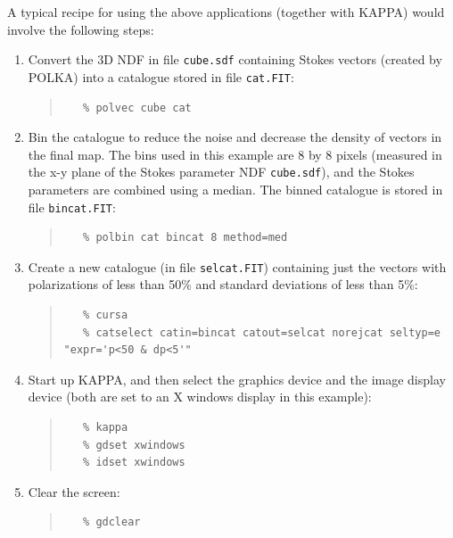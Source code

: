 \documentclass[twoside,11pt]{article}
\renewcommand{\_}{\texttt{\symbol{95}}}
\newenvironment{myquote}{\begin{quote}\begin{small}}{\end{small}\end{quote}}
\begin{document}
A typical recipe for using the above applications (together with KAPPA)
would involve the following steps:

\begin{enumerate}

\item Convert the 3D NDF in file \verb+cube.sdf+ containing Stokes vectors
(created by POLKA) into a catalogue stored in file \verb+cat.FIT+:

\begin{myquote}
\begin{verbatim}
   % polvec cube cat
\end{verbatim}
\end{myquote}

\item Bin the catalogue to reduce the noise and decrease the density
of vectors in the final map. The bins used in this example are 8 by 
8 pixels (measured in
the x-y plane of the Stokes parameter NDF \verb+cube.sdf+), and the
Stokes parameters are combined using a median. The binned catalogue is
stored in file \verb+bincat.FIT+:

\begin{myquote}
\begin{verbatim}
   % polbin cat bincat 8 method=med
\end{verbatim}
\end{myquote}

\item Create a new catalogue (in file \verb+selcat.FIT+) containing just
the vectors with polarizations of less than 50\% and standard deviations of
less than 5\%:

\begin{myquote}
\begin{verbatim}
   % cursa
   % catselect catin=bincat catout=selcat norejcat seltyp=e "expr='p<50 & dp<5'"
\end{verbatim}
\end{myquote}

\item \label{STEP:DEVICE} Start up KAPPA, and then select the graphics 
device and the image display device (both are set to an X windows display 
in this example):
\begin{myquote}
\begin{verbatim}
   % kappa
   % gdset xwindows
   % idset xwindows
\end{verbatim}
\end{myquote}

\item Clear the screen:
\begin{myquote}
\begin{verbatim}
   % gdclear
\end{verbatim}
\end{myquote}


\end{enumerate}
\end{document}
